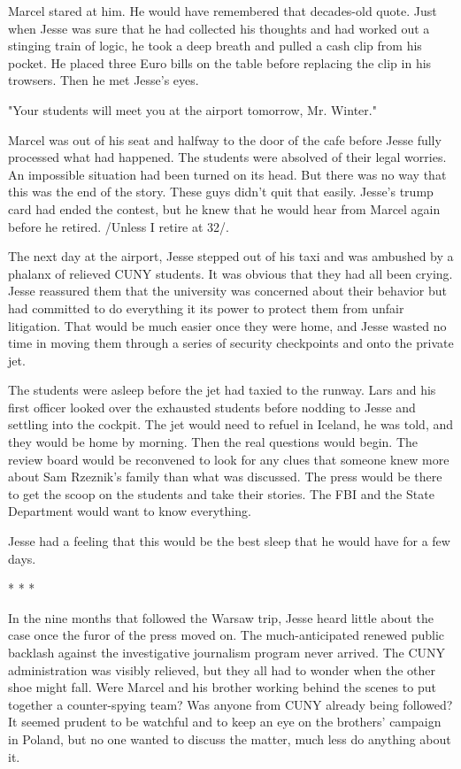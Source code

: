 Marcel stared at him.  He would have remembered that decades-old quote.  Just when Jesse was sure that he had collected his thoughts and had worked out a stinging train of logic, he took a deep breath and pulled a cash clip from his pocket.  He placed three Euro bills on the table before replacing the clip in his trowsers.  Then he met Jesse's eyes.

"Your students will meet you at the airport tomorrow, Mr. Winter."

Marcel was out of his seat and halfway to the door of the cafe before Jesse fully processed what had happened.  The students were absolved of their legal worries.  An impossible situation had been turned on its head.  But there was no way that this was the end of the story.  These guys didn't quit that easily.  Jesse's trump card had ended the contest, but he knew that he would hear from Marcel again before he retired.  /Unless I retire at 32/.


The next day at the airport, Jesse stepped out of his taxi and was ambushed by a phalanx of relieved CUNY students.  It was obvious that they had all been crying.  Jesse reassured them that the university was concerned about their behavior but had committed to do everything it its power to protect them from unfair litigation.  That would be much easier once they were home, and Jesse wasted no time in moving them through a series of security checkpoints and onto the private jet.

The students were asleep before the jet had taxied to the runway.  Lars and his first officer looked over the exhausted students before nodding to Jesse and settling into the cockpit.  The jet would need to refuel in Iceland, he was told, and they would be home by morning.  Then the real questions would begin.  The review board would be reconvened to look for any clues that someone knew more about Sam Rzeznik's family than what was discussed.  The press would be there to get the scoop on the students and take their stories.  The FBI and the State Department would want to know everything.

Jesse had a feeling that this would be the best sleep that he would have for a few days.

					* * *

In the nine months that followed the Warsaw trip, Jesse heard little about the case once the furor of the press moved on.  The much-anticipated renewed public backlash against the investigative journalism program never arrived.  The CUNY administration was visibly relieved, but they all had to wonder when the other shoe might fall.  Were Marcel and his brother working behind the scenes to put together a counter-spying team?  Was anyone from CUNY already being followed?  It seemed prudent to be watchful and to keep an eye on the brothers' campaign in Poland, but no one wanted to discuss the matter, much less do anything about it.

